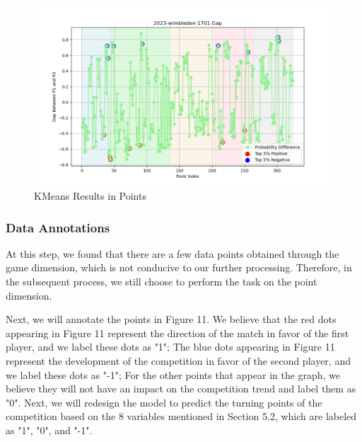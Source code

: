 \documentclass{mcmthesis}
\begin{document}
\begin{figure}[h]
\centering
\includegraphics[width=12cm]{figures/Kmeans2.png}
\caption{KMeans Results in Points} \label{fig:aa}
\end{figure}

\subsubsection{Data Annotations}
At this step, we found that there are a few data points obtained through the game dimension, which is not conducive to our further processing. Therefore, in the subsequent process, we still choose to perform the task on the point dimension.

Next, we will annotate the points in Figure 11. We believe that the red dots appearing in Figure 11 represent the direction of the match in favor of the first player, and we label these dots as "1"; The blue dots appearing in Figure 11 represent the development of the competition in favor of the second player, and we label these dots as "-1"; For the other points that appear in the graph, we believe they will not have an impact on the competition trend and label them as "0". Next, we will redesign the model to predict the turning points of the competition based on the 8 variables mentioned in Section 5.2, which are labeled as "1", "0", and "-1".
\end{document}
